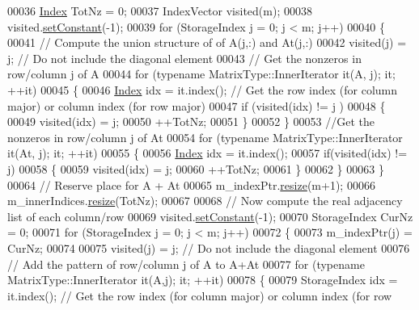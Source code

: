 \begin{DoxyCode}
00036     \hyperlink{namespace_eigen_a62e77e0933482dafde8fe197d9a2cfde}{Index} TotNz = 0; 
00037     IndexVector visited(m); 
00038     visited.\hyperlink{class_eigen_1_1_plain_object_base_ac8dea1df3d92b752cc683ff42abf6f9b}{setConstant}(-1); 
00039     \textcolor{keywordflow}{for} (StorageIndex j = 0; j < m; j++)
00040     \{
00041       \textcolor{comment}{// Compute the union structure of of A(j,:) and At(j,:)}
00042       visited(j) = j; \textcolor{comment}{// Do not include the diagonal element}
00043       \textcolor{comment}{// Get the nonzeros in row/column j of A}
00044       \textcolor{keywordflow}{for} (\textcolor{keyword}{typename} MatrixType::InnerIterator it(A, j); it; ++it)
00045       \{
00046         \hyperlink{namespace_eigen_a62e77e0933482dafde8fe197d9a2cfde}{Index} idx = it.index(); \textcolor{comment}{// Get the row index (for column major) or column index (for row
       major)}
00047         \textcolor{keywordflow}{if} (visited(idx) != j ) 
00048         \{
00049           visited(idx) = j; 
00050           ++TotNz; 
00051         \}
00052       \}
00053       \textcolor{comment}{//Get the nonzeros in row/column j of At}
00054       \textcolor{keywordflow}{for} (\textcolor{keyword}{typename} MatrixType::InnerIterator it(At, j); it; ++it)
00055       \{
00056         \hyperlink{namespace_eigen_a62e77e0933482dafde8fe197d9a2cfde}{Index} idx = it.index(); 
00057         \textcolor{keywordflow}{if}(visited(idx) != j)
00058         \{
00059           visited(idx) = j; 
00060           ++TotNz; 
00061         \}
00062       \}
00063     \}
00064     \textcolor{comment}{// Reserve place for A + At}
00065     m\_indexPtr.\hyperlink{class_eigen_1_1_plain_object_base_a99d9054ee2d5a40c6e00ded0265e9cea}{resize}(m+1);
00066     m\_innerIndices.\hyperlink{class_eigen_1_1_plain_object_base_a99d9054ee2d5a40c6e00ded0265e9cea}{resize}(TotNz); 
00067 
00068     \textcolor{comment}{// Now compute the real adjacency list of each column/row }
00069     visited.\hyperlink{class_eigen_1_1_plain_object_base_ac8dea1df3d92b752cc683ff42abf6f9b}{setConstant}(-1); 
00070     StorageIndex CurNz = 0; 
00071     \textcolor{keywordflow}{for} (StorageIndex j = 0; j < m; j++)
00072     \{
00073       m\_indexPtr(j) = CurNz; 
00074       
00075       visited(j) = j; \textcolor{comment}{// Do not include the diagonal element}
00076       \textcolor{comment}{// Add the pattern of row/column j of A to A+At}
00077       \textcolor{keywordflow}{for} (\textcolor{keyword}{typename} MatrixType::InnerIterator it(A,j); it; ++it)
00078       \{
00079         StorageIndex idx = it.index(); \textcolor{comment}{// Get the row index (for column major) or column index (for row
}
\end{DoxyCode}
